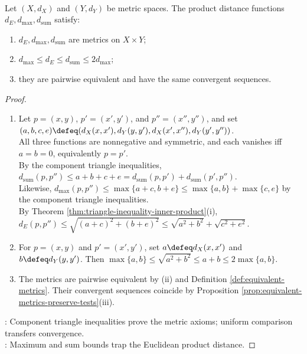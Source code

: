 \begin{proposition} \label{prop:product-metric-comparison} \\
Let $(X,d_X)$ and $(Y,d_Y)$ be metric spaces. The product distance functions $d_E,d_{\max},d_{\mathrm{sum}}$ satisfy:
\begin{enumerate}[label=(\roman*)]
\setlength{\itemsep}{0pt}
\item $d_E,d_{\max},d_{\mathrm{sum}}$ are metrics on $X\times Y$;
\item $d_{\max}\leq d_E\leq d_{\mathrm{sum}}\leq2d_{\max}$;
\item they are pairwise equivalent and have the same convergent sequences.
\end{enumerate}
\begin{proof}
\begin{enumerate}[label=(\roman*)]
\setlength{\itemsep}{0pt}
\item Let $p=(x,y)$, $p'=(x',y')$, and $p''=(x'',y'')$, and set $(a,b,c,e)\defeq(d_X(x,x'),d_Y(y,y'),d_X(x',x''),d_Y(y',y''))$.\\
All three functions are nonnegative and symmetric, and each vanishes iff $a=b=0$, equivalently $p=p'$.\\
By the component triangle inequalities, $d_{\mathrm{sum}}(p,p'')\leq a+b+c+e=d_{\mathrm{sum}}(p,p')+d_{\mathrm{sum}}(p',p'')$.\\
Likewise, $d_{\max}(p,p'')\leq\max\{a+c,b+e\}\leq\max\{a,b\}+\max\{c,e\}$ by the component triangle inequalities.\\
By Theorem \ref{thm:triangle-inequality-inner-product}(i), $d_E(p,p'')\leq\sqrt{(a+c)^2+(b+e)^2} \leq\sqrt{a^2+b^2}+\sqrt{c^2+e^2}$.
\item For $p=(x,y)$ and $p'=(x',y')$, set $a\defeq d_X(x,x')$ and $b\defeq d_Y(y,y')$. Then $\max\{a,b\}\leq\sqrt{a^2+b^2}\leq a+b\leq2\max\{a,b\}$.
\item The metrics are pairwise equivalent by (ii) and Definition \ref{def:equivalent-metrics}. Their convergent sequences coincide by Proposition \ref{prop:equivalent-metrics-preserve-tests}(iii).
\end{enumerate}
: Component triangle inequalities prove the metric axioms; uniform comparison transfers convergence.\\
: Maximum and sum bounds trap the Euclidean product distance.
\end{proof}
\end{proposition}

